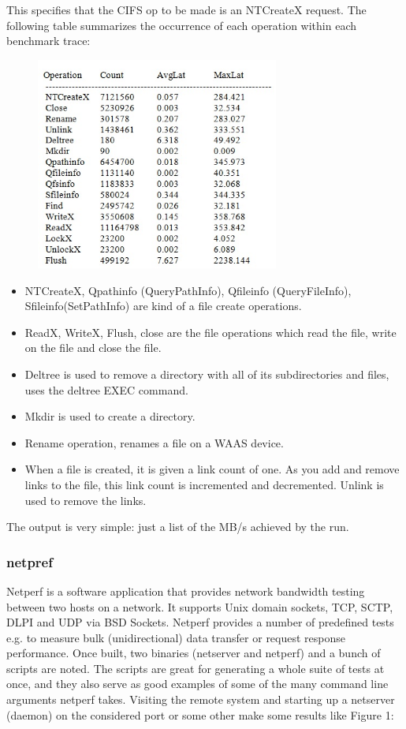 \documentclass[10pt, conference]{IEEEtran}
\begin{document}
\indent This specifies that the CIFS op to be made is an NTCreateX request. The following table summarizes the occurrence of each operation within each benchmark trace:
\begin{figure}[h!]
	\centering
	\includegraphics[width=8cm]{figure2.jpg}
\end{figure} 

\begin{itemize}
\item  NTCreateX, Qpathinfo (QueryPathInfo), Qfileinfo (QueryFileInfo), Sfileinfo(SetPathInfo) are  kind of a file create operations. 
\item ReadX, WriteX, Flush, close are the file operations which read the file, write on the file and close the file.
\item  Deltree is used to remove a directory with all of its subdirectories and files, uses the deltree EXEC command. 
\item Mkdir is used to create a directory. 
\item Rename operation, renames a file on a WAAS device.
\item When a file is created, it is given a link count of one. As you add and remove links to the file, this link count is incremented and decremented.  Unlink is used to remove the links.  
\end{itemize}

\indent The output is very simple: just a list of the MB/s achieved by the run.


\subsubsection{netpref}
\indent Netperf is a software application that provides network bandwidth testing between two hosts on a network. It supports Unix domain sockets, TCP, SCTP, DLPI and UDP via BSD Sockets. Netperf provides a number of predefined tests e.g. to measure bulk (unidirectional) data transfer or request response performance. Once built, two binaries (netserver and netperf) and a bunch of scripts are noted. The scripts are great for generating a whole suite of tests at once, and they also serve as good examples of some of the many command line arguments netperf takes. Visiting the remote system and starting up a netserver (daemon) on the considered port or some other make some results like Figure 1:\\
\end{document}
